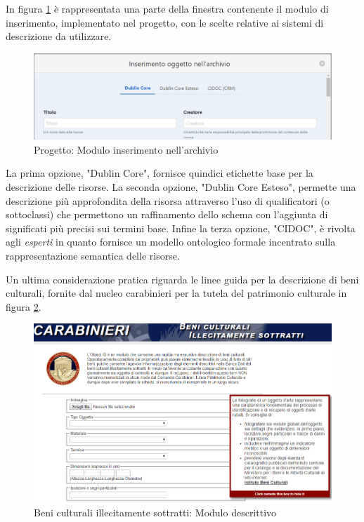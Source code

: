 In figura \ref{fig:progettoInserimento} è rappresentata una parte della finestra contenente il modulo di inserimento, implementato nel progetto, con le scelte relative ai sistemi di descrizione da utilizzare.

\begin{figure}[H]
\centering
\includegraphics[width=1\textwidth]{immagini/inserimentoArchivio.PNG}
\caption{Progetto: Modulo inserimento nell'archivio}
\label{fig:progettoInserimento}
\end{figure}

La prima opzione, "Dublin Core", fornisce quindici etichette base per la descrizione delle risorse. La seconda opzione, "Dublin Core Esteso", permette una descrizione più approfondita della risorsa attraverso l'uso di qualificatori (o sottoclassi) che permettono un raffinamento dello schema con l'aggiunta di significati più precisi sui termini base. Infine la terza opzione, "CIDOC", è rivolta agli \emph{esperti} in quanto fornisce un modello ontologico formale incentrato sulla rappresentazione semantica delle risorse.

Un ultima considerazione pratica riguarda le linee guida per la descrizione di beni culturali, fornite dal nucleo carabinieri per la tutela del patrimonio culturale in figura \ref{fig:carabinieriTPC}.

\begin{figure}[H]
\centering
\includegraphics[width=1\textwidth]{immagini/carabinieriTPC2.png}
\caption{Beni culturali illecitamente sottratti: Modulo descrittivo}
\label{fig:carabinieriTPC}
\end{figure}

